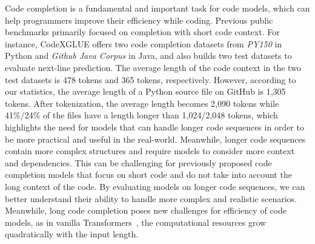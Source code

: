 \documentclass{article}
\begin{document}
Code completion is a fundamental and important task for code models, %
which can help programmers improve their efficiency while coding. Previous public benchmarks primarily focused on completion with short code context. For instance, CodeXGLUE \cite{lu2021codexglue} offers two code completion datasets from \textit{PY150} \cite{raychev2016probabilistic} in Python and \textit{Github Java Corpus} \citet{allamanis2013mining} in Java, and also builds two test datasets to evaluate next-line prediction. The average length of the code context in the two test datasets is 478 tokens and 365 tokens, respectively. However, according to our statistics, the average length of a Python source file on GitHub is 1,305 tokens. After tokenization, %
the average length becomes 2,090 tokens while 41\%/24\% of the files have a length longer than 1,024/2,048 tokens, which highlights the need for models that can handle longer code sequences in order to be more practical and useful in the real-world.
Meanwhile, longer code sequences contain more complex structures and require models to consider more context and dependencies. This can be challenging for previously proposed code completion models that focus on short code and do not take into account the long context of the code. By evaluating models on longer code sequences, we can better understand their ability to handle more complex and realistic scenarios. Meanwhile, long code completion poses new challenges for efficiency of code models, as in vanilla Transformers~\citep{transformer}, the computational resources grow quadratically with the input length.
\end{document}
